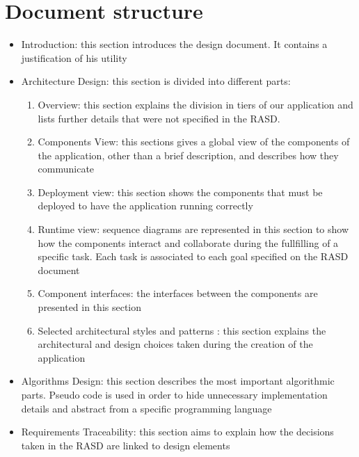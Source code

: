 \section{Document structure}
\begin{itemize}
\item Introduction: this section introduces the design document. It contains a justification of his utility
\item Architecture Design: this section is divided into different parts:
\begin{enumerate}
\item Overview: this section explains the division in tiers of our application and lists further details that were not specified in the RASD.
\item Components View: this sections gives a global view of the components of the application, other than a brief description, and describes how they communicate
\item Deployment view: this section shows the components that must be deployed to have the application running correctly
\item Runtime view: sequence diagrams are represented in this section to show how the components interact and collaborate during the fullfilling of a specific task. Each task is associated to each goal specified on the RASD document
\item Component interfaces: the interfaces between the components are presented in this section
\item Selected architectural styles and patterns : this section explains the architectural and design choices taken during the creation of the application
\end{enumerate}
\item Algorithms Design: this section describes the most important algorithmic parts. Pseudo code is used in order to hide unnecessary implementation details and abstract from a specific programming language
\item Requirements Traceability: this section aims to explain how the decisions taken in the RASD are linked to design elements
\end{itemize}



 
